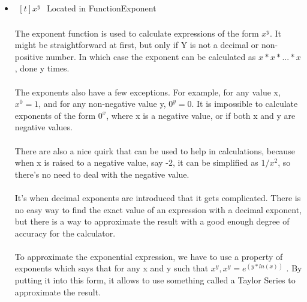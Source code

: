 \begin{itemize}
        \item $\begin{aligned}[t]
            x^y
        \end{aligned}$
            Located in FunctionExponent

            \paragraph{}
            The exponent function is used to calculate expressions of the form $x^y$. It might be straightforward at first, but only if Y is not a decimal or non-positive number. In which case the exponent can be calculated as $x*x*...*x$, done y times.

            \paragraph{}
            The exponents also have a few exceptions. For example, for any value x, $x^0=1$, and for any non-negative value y, $0^y=0$. It is impossible to calculate exponents of the form $0^x$, where x is a negative value, or if both x and y are negative values.

            \paragraph{}
            There are also a nice quirk that can be used to help in calculations, because when x is raised to a negative value, say -2, it can be simplified as $1/x^2$, so there’s no need to deal with the negative value.

            \paragraph{}
            It’s when decimal exponents are introduced that it gets complicated. There is no easy way to find the exact value of an expression with a decimal exponent, but there is a way to approximate the result with a good enough degree of accuracy for the calculator.

            \paragraph{}
            To approximate the exponential expression, we have to use a property of exponents which says that for any x and y such that $x^y, x^y = e^(y * ln(x))$ \cite{wikiE} . By putting it into this form, it allows to use something called a Taylor Series to approximate the result.


\end{itemize}
